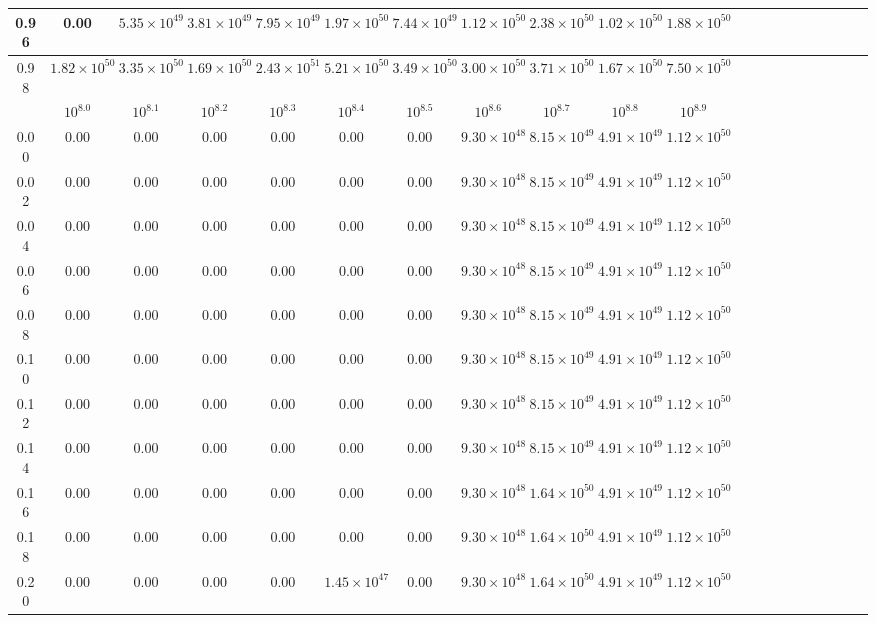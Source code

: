 \begin{table*}
\begin{tabular}{ccccccccccccccccccccc}
\hline
0.96  &0.00 &$5.35\times 10^{49}$ &$3.81\times 10^{49}$ &$7.95\times 10^{49}$ &$1.97\times 10^{50}$ &$7.44\times 10^{49}$ &$1.12\times 10^{50}$ &$2.38\times 10^{50}$ &$1.02\times 10^{50}$ &$1.88\times 10^{50}$ \\
\hline
0.98  &$1.82\times 10^{50}$ &$3.35\times 10^{50}$ &$1.69\times 10^{50}$ &$2.43\times 10^{51}$ &$5.21\times 10^{50}$ &$3.49\times 10^{50}$ &$3.00\times 10^{50}$ &$3.71\times 10^{50}$ &$1.67\times 10^{50}$ &$7.50\times 10^{50}$ \\
\hline
\hline
& $10^{8.0}$  & $10^{8.1}$  & $10^{8.2}$  & $10^{8.3}$  & $10^{8.4}$  & $10^{8.5}$  & $10^{8.6}$  & $10^{8.7}$  & $10^{8.8}$  & $10^{8.9}$  \\
\hline
0.00  &0.00 &0.00 &0.00 &0.00 &0.00 &0.00 &$9.30\times 10^{48}$ &$8.15\times 10^{49}$ &$4.91\times 10^{49}$ &$1.12\times 10^{50}$ \\
\hline
0.02  &0.00 &0.00 &0.00 &0.00 &0.00 &0.00 &$9.30\times 10^{48}$ &$8.15\times 10^{49}$ &$4.91\times 10^{49}$ &$1.12\times 10^{50}$ \\
\hline
0.04  &0.00 &0.00 &0.00 &0.00 &0.00 &0.00 &$9.30\times 10^{48}$ &$8.15\times 10^{49}$ &$4.91\times 10^{49}$ &$1.12\times 10^{50}$ \\
\hline
0.06  &0.00 &0.00 &0.00 &0.00 &0.00 &0.00 &$9.30\times 10^{48}$ &$8.15\times 10^{49}$ &$4.91\times 10^{49}$ &$1.12\times 10^{50}$ \\
\hline
0.08  &0.00 &0.00 &0.00 &0.00 &0.00 &0.00 &$9.30\times 10^{48}$ &$8.15\times 10^{49}$ &$4.91\times 10^{49}$ &$1.12\times 10^{50}$ \\
\hline
0.10  &0.00 &0.00 &0.00 &0.00 &0.00 &0.00 &$9.30\times 10^{48}$ &$8.15\times 10^{49}$ &$4.91\times 10^{49}$ &$1.12\times 10^{50}$ \\
\hline
0.12  &0.00 &0.00 &0.00 &0.00 &0.00 &0.00 &$9.30\times 10^{48}$ &$8.15\times 10^{49}$ &$4.91\times 10^{49}$ &$1.12\times 10^{50}$ \\
\hline
0.14  &0.00 &0.00 &0.00 &0.00 &0.00 &0.00 &$9.30\times 10^{48}$ &$8.15\times 10^{49}$ &$4.91\times 10^{49}$ &$1.12\times 10^{50}$ \\
\hline
0.16  &0.00 &0.00 &0.00 &0.00 &0.00 &0.00 &$9.30\times 10^{48}$ &$1.64\times 10^{50}$ &$4.91\times 10^{49}$ &$1.12\times 10^{50}$ \\
\hline
0.18  &0.00 &0.00 &0.00 &0.00 &0.00 &0.00 &$9.30\times 10^{48}$ &$1.64\times 10^{50}$ &$4.91\times 10^{49}$ &$1.12\times 10^{50}$ \\
\hline
0.20  &0.00 &0.00 &0.00 &0.00 &$1.45\times 10^{47}$ &0.00 &$9.30\times 10^{48}$ &$1.64\times 10^{50}$ &$4.91\times 10^{49}$ &$1.12\times 10^{50}$ \\

\end{tabular}
\end{table*}
